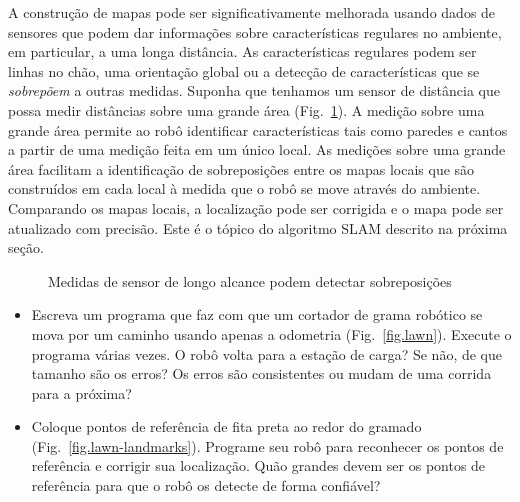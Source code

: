 A construção de mapas pode ser significativamente melhorada usando dados de sensores que podem dar informações sobre características regulares no ambiente, em particular, a uma longa distância. As características regulares podem ser linhas no chão, uma orientação global ou a detecção de características que se \emph{sobrepõem} a outras medidas. Suponha que tenhamos um sensor de distância que possa medir distâncias sobre uma grande área (Fig.~\ref{fig.map_overlap}). A medição sobre uma grande área permite ao robô identificar características tais como paredes e cantos a partir de uma medição feita em um único local. As medições sobre uma grande área facilitam a identificação de sobreposições entre os mapas locais que são construídos em cada local à medida que o robô se move através do ambiente. Comparando os mapas locais, a localização pode ser corrigida e o mapa pode ser atualizado com precisão. Este é o tópico do algoritmo SLAM descrito na próxima seção.

\begin{figure}
\begin{center}
\end{center}
\caption{Medidas de sensor de longo alcance podem detectar sobreposições}\label{fig.map_overlap}
\end{figure}

\begin{framed}
\begin{itemize}
\item Escreva um programa que faz com que um cortador de grama robótico se mova por um caminho usando apenas a odometria (Fig.~\ref{fig.lawn}). Execute o programa várias vezes. O robô volta para a estação de carga? Se não, de que tamanho são os erros? Os erros são consistentes ou mudam de uma corrida para a próxima?
\item Coloque pontos de referência de fita preta ao redor do gramado (Fig.~\ref{fig.lawn-landmarks}). Programe seu robô para reconhecer os pontos de referência e corrigir sua localização. Quão grandes devem ser os pontos de referência para que o robô os detecte de forma confiável?
\end{itemize}
\end{framed}

